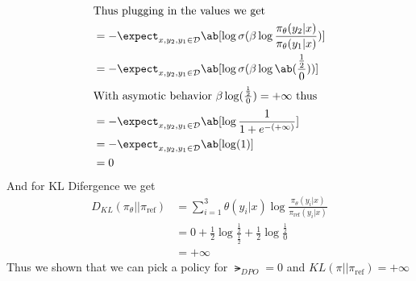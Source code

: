 \documentclass[12pt]{amsart}
\begin{document}
\begin{problem}
\begin{subproblem}
\begin{align*}
                                \intertext{Thus plugging in the values we get}
                                &= -\expect_{x,y_2,y_1\in \mathcal{D}}\ab[\log\sigma(\beta\log\frac{\pi_\theta(y_2|x)}{\pi_\theta(y_1|x)})] \\
                                &= -\expect_{x,y_2,y_1\in \mathcal{D}}\ab[\log\sigma(\beta\log\ab(\frac{\frac12}{0}))] \\
                                \intertext{With asymotic behavior $\beta\log(\frac{\frac12}{0})=+\infty$ thus}
                                &= -\expect_{x,y_2,y_1\in \mathcal{D}}\ab[\log\frac1{1+e^{-(+\infty)}}] \\
                                &= -\expect_{x,y_2,y_1\in \mathcal{D}}\ab[\log(1)] \\
                                &= 0
      \end{align*}
      And for KL Difergence we get
      \begin{align*}
        D_{KL}(\pi_\theta||\pi_{\text{ref}}) &= \sum_{i=1}^3\theta(y_i|x)\log\frac{\pi_\theta(y_i|x)}{\pi_{\text{ref}}(y_i|x)} \\
                                      &= 0 + \frac12\log\frac{\frac12}{\frac12}+\frac12\log\frac{\frac12}{0}\\
                                      &= +\infty
      \end{align*}
      Thus we shown that we can pick a policy for $\lat_{DPO}=0$ and $KL(\pi||\pi_\text{ref})=+\infty$

\end{subproblem}
\end{problem}
\end{document}
